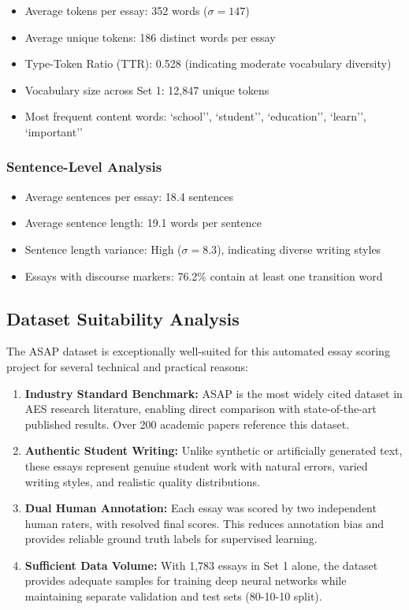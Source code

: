 ﻿\documentclass[12pt,a4paper]{article}
\begin{document}
\begin{itemize}
    \item Average tokens per essay: 352 words ($\sigma = 147$)
    \item Average unique tokens: 186 distinct words per essay
    \item Type-Token Ratio (TTR): 0.528 (indicating moderate vocabulary diversity)
    \item Vocabulary size across Set 1: 12,847 unique tokens
    \item Most frequent content words: `school'', `student'', `education'', `learn'', `important''
\end{itemize}

\subsubsection{Sentence-Level Analysis}
\begin{itemize}
    \item Average sentences per essay: 18.4 sentences
    \item Average sentence length: 19.1 words per sentence
    \item Sentence length variance: High ($\sigma = 8.3$), indicating diverse writing styles
    \item Essays with discourse markers: 76.2\% contain at least one transition word
\end{itemize}

\subsection{Dataset Suitability Analysis}
The ASAP dataset is exceptionally well-suited for this automated essay scoring project for several technical and practical reasons:

\begin{enumerate}
    \item \textbf{Industry Standard Benchmark:} ASAP is the most widely cited dataset in AES research literature, enabling direct comparison with state-of-the-art published results. Over 200 academic papers reference this dataset.
    
    \item \textbf{Authentic Student Writing:} Unlike synthetic or artificially generated text, these essays represent genuine student work with natural errors, varied writing styles, and realistic quality distributions.
    
    \item \textbf{Dual Human Annotation:} Each essay was scored by two independent human raters, with resolved final scores. This reduces annotation bias and provides reliable ground truth labels for supervised learning.
    
    \item \textbf{Sufficient Data Volume:} With 1,783 essays in Set 1 alone, the dataset provides adequate samples for training deep neural networks while maintaining separate validation and test sets (80-10-10 split).
\end{enumerate}
\end{document}
